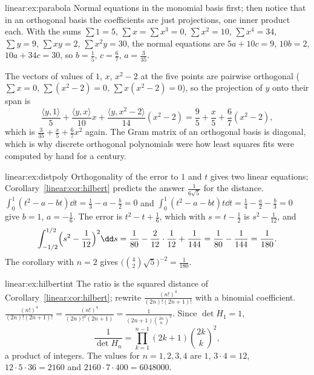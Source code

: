 \begin{solution}{linear:ex:parabola}
\idea Normal equations in the monomial basis first; then notice that in an orthogonal basis the coefficients are just
projections, one inner product each.
\writeup With the sums $\sum1=5$, $\sum x=\sum x^3=0$, $\sum x^2=10$, $\sum x^4=34$, $\sum y=9$, $\sum xy=2$, $\sum
x^2y=30$, the normal equations are $5a+10c=9$, $10b=2$, $10a+34c=30$, so $b=\frac15$, $c=\frac67$, $a=\frac3{35}$.

The vectors of values of $1$, $x$, $x^2-2$ at the five points are pairwise orthogonal ($\sum x=0$, $\sum(x^2-2)=0$,
$\sum x(x^2-2)=0$), so the projection of $y$ onto their span is
\[
\frac{\langle y,1\rangle}{5}+\frac{\langle y,x\rangle}{10}x+\frac{\langle y,x^2-2\rangle}{14}(x^2-2)=\frac95+\frac x5+
\frac67(x^2-2),
\]
which is $\frac3{35}+\frac x5+\frac67x^2$ again. The Gram matrix of an orthogonal basis is diagonal, which is why discrete
orthogonal polynomials were how least squares fits were computed by hand for a century.
\end{solution}

\begin{solution}{linear:ex:distpoly}
\idea Orthogonality of the error to $1$ and $t$ gives two linear equations; Corollary~\ref{linear:cor:hilbert} predicts the
answer $\frac1{6\sqrt5}$ for the distance.
\writeup $\int_0^1(t^2-a-bt)\dd t=\frac13-a-\frac b2=0$ and $\int_0^1(t^2-a-bt)t\dd t=\frac14-\frac a2-\frac b3=0$ give
$b=1$, $a=-\frac16$. The error is $t^2-t+\frac16$, which with $s=t-\frac12$ is $s^2-\frac1{12}$, and
\[
\int_{-1/2}^{1/2}\Bigl(s^2-\frac1{12}\Bigr)^2\dd s=\frac1{80}-\frac2{12}\cdot\frac1{12}+\frac1{144}=\frac1{80}-\frac1{144}=\frac1{180}.
\]
The corollary with $n=2$ gives $\bigl(\binom42\sqrt5\bigr)^{-2}=\frac1{180}$.
\end{solution}

\begin{solution}{linear:ex:hilbertint}
\idea The ratio is the squared distance of Corollary~\ref{linear:cor:hilbert}; rewrite $\frac{(n!)^4}{(2n)!(2n+1)!}$ with a
binomial coefficient.
\writeup $\frac{(n!)^4}{(2n)!(2n+1)!}=\frac{(n!)^4}{(2n)!^2(2n+1)}=\frac1{(2n+1)\binom{2n}n^2}$. Since $\det H_1=1$,
\[
\frac1{\det H_n}=\prod_{k=1}^{n-1}(2k+1)\binom{2k}k^2,
\]
a product of integers. The values for $n=1,2,3,4$ are $1$, $3\cdot4=12$, $12\cdot5\cdot36=2160$ and $2160\cdot7\cdot400=
6048000$.
\end{solution}

